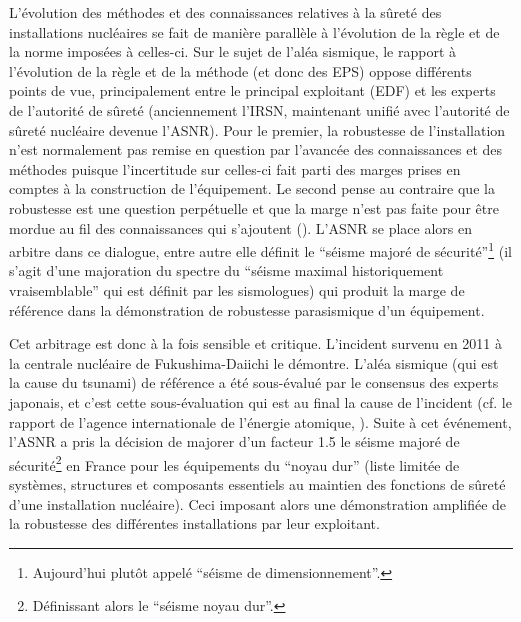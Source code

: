 L'évolution des méthodes et des connaissances relatives à la sûreté des installations nucléaires se fait de manière parallèle à l'évolution de la règle et de la norme imposées à celles-ci. 
Sur le sujet de l'aléa sismique, le rapport à l'évolution de la règle et de la méthode (et donc des EPS) oppose différents points de vue, principalement entre le principal exploitant (EDF) et les experts de l'autorité de sûreté (anciennement l'IRSN, maintenant unifié avec l'autorité de sûreté nucléaire devenue l'ASNR). 
Pour le premier, la robustesse de l'installation n'est normalement pas remise en question par l'avancée des connaissances et des méthodes puisque l’incertitude sur celles-ci fait parti des marges prises en comptes à la construction de l'équipement. %
Le second pense au contraire que la robustesse est une question perpétuelle et que la marge n’est pas faite pour être mordue au fil des connaissances qui s’ajoutent (\cite{roger_seisme_2020}). 
L'ASNR se place alors en arbitre dans ce dialogue, entre autre elle définit le ``séisme majoré de sécurité''\footnote{Aujourd'hui plutôt appelé ``séisme de dimensionnement''.} (il s'agit d'une majoration du spectre du ``séisme maximal historiquement vraisemblable'' qui est définit par les sismologues) qui produit la marge de référence dans la démonstration de robustesse parasismique d'un équipement. %
%


Cet arbitrage est donc à la fois sensible et critique.
L'incident survenu en 2011 à la centrale nucléaire de Fukushima-Daiichi le démontre. L'aléa sismique (qui est la cause du tsunami) de référence
a été sous-évalué par le consensus des experts japonais, et c'est cette sous-évaluation qui est au final la cause de l'incident (cf. le rapport de l'agence internationale de l'énergie atomique, \cite{iaea_fukushima_2015}).
Suite à cet événement, l'ASNR a pris la décision de majorer d'un facteur 1.5 le séisme majoré de sécurité\footnote{Définissant alors le ``séisme noyau dur''.} en France pour les équipements du ``noyau dur'' (liste limitée de systèmes, structures et composants essentiels au maintien des fonctions de sûreté d'une installation nucléaire). Ceci imposant alors une démonstration amplifiée de la robustesse des différentes installations par leur exploitant.



